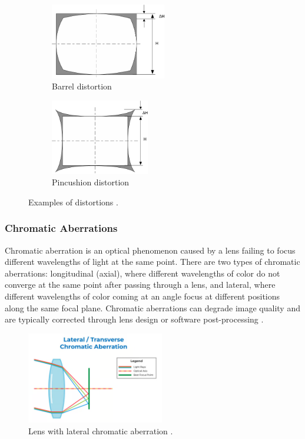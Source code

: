 \begin{figure}[htbp]
  \centering
  \begin{subfigure}[b]{0.45\textwidth}
    \centering
    \includegraphics[height=3.3cm]{Images/barrel_distortion.png}
    \caption{Barrel distortion}
    \label{fig:barrel}
  \end{subfigure}
  \hfill
  \begin{subfigure}[b]{0.45\textwidth}
    \centering
    \includegraphics[height=3.3cm]{Images/pincushion_distortion.png}
    \caption{Pincushion distortion}
    \label{fig:pincushion}
  \end{subfigure}
  \caption{Examples of distortions \cite{distortions}.}
  \label{fig:distortions}
\end{figure}

\subsubsection{Chromatic Aberrations}
Chromatic aberration is an optical phenomenon caused by a lens failing to focus different wavelengths of light at the same point. There are two types of chromatic aberrations: longitudinal (axial), where different wavelengths of color do not converge at the same point after passing through a lens, and lateral, where different wavelengths of color coming at an angle focus at different positions along the same focal plane. Chromatic aberrations can degrade image quality and are typically corrected through lens design or software post-processing \cite{ChromaticAberation}.

\begin{figure}[h]
\centering
\includegraphics[height=4cm]{Images/chromatic_aberation.png}
\caption{Lens with lateral chromatic aberration \cite{ChromaticAberation}.}
\label{fig:chrom_ab}
\end{figure}

